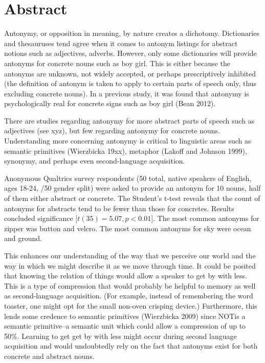 \clearpage
\section {Abstract}
Antonymy, or opposition in meaning, by nature creates a dichotomy.  Dictionaries and thesauruses tend agree when it comes to antonym listings for abstract notions such as adjectives, adverbs.  However, only some dictionaries will provide antonyms for concrete nouns such as boy \opp girl.  This is either because the antonyms are unknown, not widely accepted, or perhaps prescriptively inhibited (the definition of antonym is taken to apply to certain parts of speech only, thus excluding concrete nouns).  In a previous study, it was found that antonymy is psychologically real for concrete signs such as boy \opp girl (Bean 2012).  

There are studies regarding antonymy for more abstract parts of speech such as adjectives (see xyz), but few regarding antonymy for concrete nouns.  Understanding more concerning antonymy is critical to linguistic areas such as semantic primitives (Wierzbicka 19xx), metaphor (Lakoff and Johnson 1999), synonymy, and perhaps even second-language acquisition.  

Anonymous Qualtrics survey respondents (50 total, native speakers of English, ages 18-24, /50 gender split) were asked to provide an antonym for 10 nouns, half of them either abstract or concrete.  The Student’s t-test reveals that the count of antonyms for abstracts tend to be fewer than those for concretes.  Results concluded significance [$t(35) = 5.07, p < 0.01$].  The most common antonyms for zipper was button and velcro.  The most common antonyms for sky were ocean and ground\footnotemark.

This enhances our understanding of the way that we perceive our world and the way in which we might describe it as we move through time.  It could be posited that knowing the relation of things would allow a speaker to get by with less. This is a type of compression that would probably be helpful to memory as well as second-language acquisition.  (For example, instead of remembering the word toaster, one might opt for the small non-oven crisping device\footnotemark.)  Furthermore, this lends some credence to semantic primitives (Wierzbicka 2009) since NOT\footnotemark is a semantic primitive--a semantic unit which could allow a compression of up to 50\%.  Learning to get get by with less might occur during second language acquisition and would undoubtedly rely on the fact that antonyms exist for both concrete and abstract nouns.

